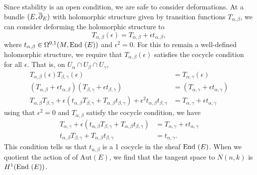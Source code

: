 	Since stability is an open condition, we are safe to consider deformations. At a bundle $(E,\overline{\partial}_E)$ with holomorphic structure given by transition functions $T_{\alpha,\beta}$, we can consider deforming the holomorphic structure to 
	\begin{equation}
	T_{\alpha,\beta}(\epsilon) = T_{\alpha,\beta} + \epsilon t_{\alpha,\beta},
	\end{equation}
	where $t_{\alpha,\beta} \in \Omega^{0,1}(M,\text{End }(E))$ and $\epsilon^2=0$. For this to remain a well-defined holomorphic structure, we require that $T_{\alpha,\beta}(\epsilon)$ satisfies the cocycle condition for all $\epsilon$. That is, on $U_{\alpha}\cap U_{\beta}\cap U_{\gamma}$,
	\begin{align*}
	T_{\alpha,\beta}(\epsilon)T_{\beta,\gamma}(\epsilon) &= T_{\alpha,\gamma}(\epsilon)\\
	\left(T_{\alpha,\beta} + \epsilon t_{\alpha,\beta} \right)
	\left(T_{\beta,\gamma} + \epsilon t_{\beta,\gamma} \right) &=
	\left(T_{\alpha,\gamma} + \epsilon t_{\alpha,\gamma} \right)\\
	T_{\alpha,\beta}T_{\beta,\gamma} + \epsilon(t_{\alpha,\beta}T_{\beta,\gamma} + T_{\alpha,\beta} t_{\beta,\gamma}) + \epsilon^2 t_{\alpha,\beta}t_{\beta,\gamma} &= T_{\alpha,\gamma} + \epsilon t_{\alpha,\gamma}
	\end{align*}
	using that $\epsilon^2 = 0$ and $T_{\alpha,\beta}$ satisfy the cocycle condition, we have
	\begin{align*}
	T_{\alpha,\gamma} + \epsilon(t_{\alpha,\beta} T_{\beta,\gamma} + T_{\alpha,\beta} t_{\beta,\gamma}) &= T_{\alpha,\gamma} + \epsilon t_{\alpha,\gamma}\\
	t_{\alpha,\beta} T_{\beta,\gamma} + T_{\alpha,\beta} t_{\beta,\gamma} &= t_{\alpha,\gamma}.
	\end{align*}
	This condition tells us that $t_{\alpha,\beta}$ is a 1 cocycle in the sheaf $\text{End }(E)$. When we quotient the action of of $\text{Aut}(E)$, we find that the tangent space to $N(n,k)$ is $H^1(\text{End }(E))$. 
	
